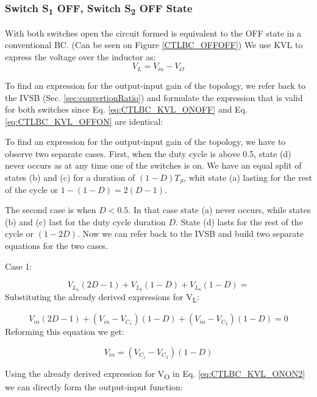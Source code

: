 \subsubsection{Switch S\textsubscript{1} OFF, Switch S\textsubscript{2} OFF State}
With both switches open the circuit formed is equivalent to the OFF state in a conventional BC. (Can be seen on Figure \ref{CTLBC_OFFOFF}) We use KVL to express the voltage over the inductor as: 
\begin{equation}
	V_{L}=V_{in}-V_{O}
	\label{eq:CTLBC_KVL_OFFOFF}
\end{equation}


To find an expression for the output-input gain of the topology, we refer back to the IVSB (Sec. \ref{sec:convertionRatio}) and formulate the expression that is valid for both switches since Eq. \ref{eq:CTLBC_KVL_ONOFF} and Eq. \ref{eq:CTLBC_KVL_OFFON} are identical:

To find an expression for the output-input gain of the topology, we 
have to observe two separate cases. First, when the duty cycle is above 0.5, state (d) never occurs as at any time one of the switches is on. We have an equal split of states (b) and (c) for a duration of $(1-D)T_S$, whit state (a) lasting for the rest of the cycle or $1-(1-D)=2(D-1)$.

The second case is when $D<0.5$. In that case state (a) never occurs, while states (b) and (c) last for the duty cycle duration $D$. State (d) lasts for the rest of the cycle or $(1-2D)$.
Now we can refer back to the IVSB and build two separate equations for the two cases. 

Case 1: 

\begin{equation}
	V_{L_a}(2D-1)+V_{L_b}(1-D)+V_{L_b}(1-D)=
	\label{eq:CTLBC_IVSB}
\end{equation}
Substituting the already derived expressions for V\textsubscript{L}:

\begin{equation}
	V_{in}(2D-1)+(V_{in} - V_{C_1})(1-D)+(V_{in} - V_{C_2})(1-D)=0
	\label{eq:CTLBC_IVSB2}
\end{equation}
Reforming this equation we get: 

\begin{equation}
	V_{in}=(V_{C_1} - V_{C_2})(1-D)
	\label{eq:CTLBC_IVSB3}
\end{equation}

Using the already derived expression for V\textsubscript{O} in Eq. \ref{eq:CTLBC_KVL_ONON2} we can directly form the output-input function: 

